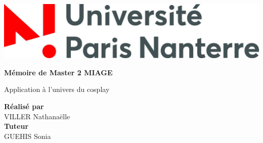 \documentclass[a4paper,12pt]{article}
\begin{document}
\begin{titlepage}
		\newpage
		\thispagestyle{empty}
		\begin{center}
			\includegraphics[scale=0.15]{images/logo_fac}	
		\end{center}
		\begin{center}
			\vspace{0.3cm}
			\large  
			\textbf{Mémoire de Master 2 MIAGE}\\
			\vspace{0.7cm} \large 
			\vskip 0.2in
		\end{center}
		\begin{center}
		    Application à l’univers du cosplay
		\end{center}
		
		\begin{flushleft}
			\begin{center}
			
					\textbf{Réalisé par} \\
					\hspace{0.1cm} VILLER Nathanaëlle \\
					\textbf{Tuteur}\\
				 \hspace{0.1cm} GUEHIS Sonia \\
			
			\end{center}
		\end{flushleft}
	

\end{titlepage}
\end{document}

